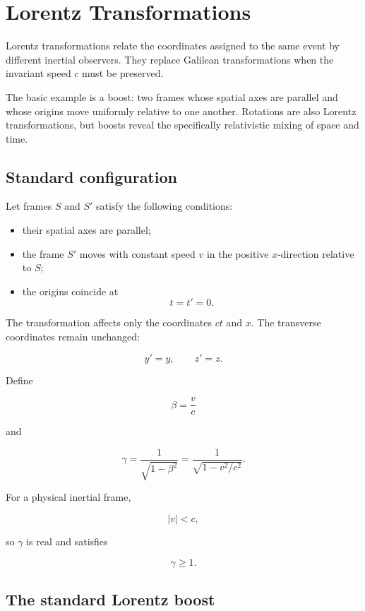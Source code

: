 \section{Lorentz Transformations}
\label{sec:lorentz_transformations}

Lorentz transformations relate the coordinates assigned to the same event by different inertial observers. They replace Galilean transformations when the invariant speed \(c\) must be preserved.

The basic example is a boost: two frames whose spatial axes are parallel and whose origins move uniformly relative to one another. Rotations are also Lorentz transformations, but boosts reveal the specifically relativistic mixing of space and time.

\subsection{Standard configuration}

Let frames \(S\) and \(S'\) satisfy the following conditions:

\begin{itemize}
    \item their spatial axes are parallel;
    \item the frame \(S'\) moves with constant speed \(v\) in the positive \(x\)-direction relative to \(S\);
    \item the origins coincide at
    \[
    t=t'=0.
    \]
\end{itemize}

The transformation affects only the coordinates \(ct\) and \(x\). The transverse coordinates remain unchanged:

\[
y'=y,
\qquad
z'=z.
\]

Define

\[
\boxed{
\beta=\frac{v}{c}
}
\]

and

\[
\boxed{
\gamma
=
\frac{1}{\sqrt{1-\beta^{2}}}
=
\frac{1}{\sqrt{1-v^{2}/c^{2}}}
}.
\]

For a physical inertial frame,

\[
|v|<c,
\]

so \(\gamma\) is real and satisfies

\[
\gamma\geq1.
\]

\subsection{The standard Lorentz boost}

